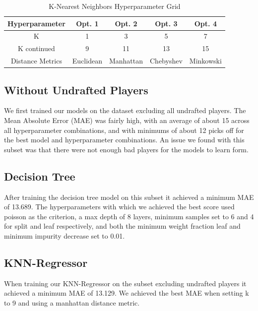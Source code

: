 \documentclass{article}
\begin{document}
\begin{table}
	\begin{center}
		\begin{tabular}{||c c c c c||} 
		\hline\hline
		Hyperparameter & Opt. 1 & Opt. 2 & Opt. 3 & Opt. 4 \\ 
		\hline\hline
		K & 1 & 3 & 5 & 7 \\ \hline
		K continued & 9 & 11 & 13 & 15 \\ \hline
		Distance Metrics & Euclidean & Manhattan & Chebyshev & Minkowski \\ \hline
		\hline\hline
		\end{tabular}
	\end{center}
	\caption{K-Nearest Neighbors Hyperparameter Grid}
	\label{tab:knn_grid}
\end{table}

\subsection{Without Undrafted Players}

We first trained our models on the dataset excluding all undrafted players. The
Mean Absolute Error (MAE) was fairly high, with an average of about 15 across
all hyperparameter combinations, and with minimums of about 12 picks off for the
best model and hyperparameter combinations. An issue we found with this subset
was that there were not enough bad players for the models to learn form. 

\subsection{Decision Tree}

After training the decision tree model on this subset it achieved a minimum MAE
of 13.689. The hyperparameters with which we achieved the best score used
poisson as the criterion, a max depth of 8 layers, minimum samples set to 6 and
4 for split and leaf respectively, and both the minimum weight fraction leaf and
minimum impurity decrease set to 0.01.

\subsection{KNN-Regressor}

When training our KNN-Regressor on the subset excluding undrafted players it
achieved a minimum MAE of 13.129. We achieved the best MAE when setting k to 9
and using a manhattan distance metric.
\end{document}
